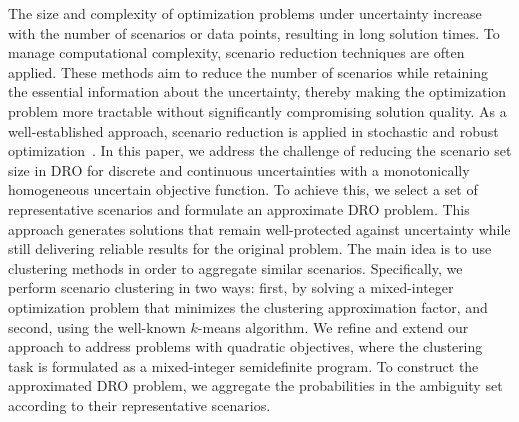 \documentclass{article}
\begin{document}
The size and complexity of optimization problems under uncertainty
increase with the number of scenarios or data points, resulting in long solution times.
To manage computational complexity, scenario reduction techniques are often applied.
These methods aim to reduce the number of scenarios while retaining the essential information about the uncertainty, thereby making the optimization problem more tractable without significantly compromising solution quality.
As a well-established approach, scenario reduction is applied in stochastic and robust optimization~\citep{goerigk_scen_reduction, roemisch-scenredSO}.
In this paper, we address the challenge of reducing the scenario set
size in DRO for discrete and continuous uncertainties with a
monotonically homogeneous uncertain objective function. %
To achieve this, we select a set of representative scenarios and formulate an approximate DRO problem.
This approach generates solutions that remain well-protected against uncertainty while still delivering reliable results for the original problem.
The main idea is to use clustering methods in order to aggregate similar scenarios.
Specifically, we perform scenario clustering in two ways: first, by solving a mixed-integer optimization problem that minimizes the clustering approximation factor, and second, using the well-known $k$-means algorithm.
We refine and extend our approach to address problems with quadratic objectives, where the clustering task is formulated as a mixed-integer semidefinite program.
To construct the approximated DRO problem, we aggregate the probabilities in the ambiguity set according to their representative scenarios.
\end{document}
